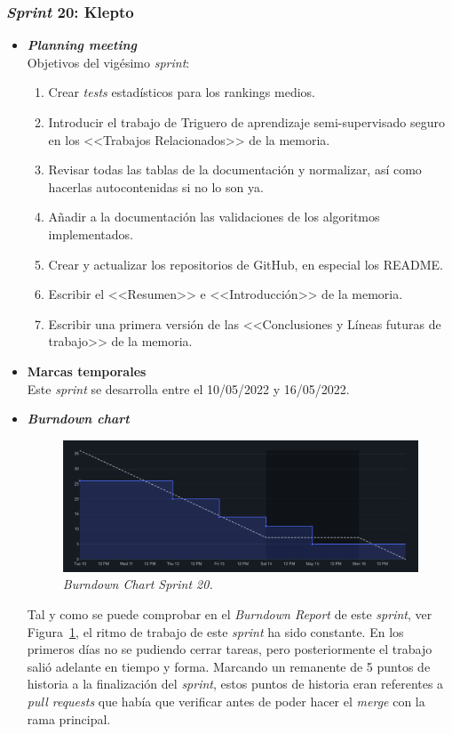\subsubsection{\textit{Sprint} 20: Klepto}
\begin{itemize}
\item \textbf{\textit{Planning meeting}}\\
Objetivos del vigésimo \textit{sprint}:
\begin{enumerate}
\item Crear \textit{tests} estadísticos para los rankings medios.
\item Introducir el trabajo de Triguero de aprendizaje semi-supervisado seguro~\cite{triguero2014characterization} en los <<Trabajos Relacionados>> de la memoria.
\item Revisar todas las tablas de la documentación y normalizar, así como hacerlas autocontenidas si no lo son ya.
\item Añadir a la documentación las validaciones de los algoritmos implementados.
\item Crear y actualizar los repositorios de GitHub, en especial los README.
\item Escribir el <<Resumen>> e <<Introducción>> de la memoria.
\item Escribir una primera versión de las <<Conclusiones y Líneas futuras de trabajo>> de la memoria.
\end{enumerate}

\item \textbf{Marcas temporales}\\
Este \textit{sprint} se desarrolla entre el 10/05/2022 y 16/05/2022.

\item \textbf{\textit{Burndown chart}}\\
\begin{figure}
\begin{center}
\includegraphics[width=\textwidth]{../img/anexos/sprints/BD-Sprint20}
\caption{\textit{Burndown Chart Sprint 20.}}\label{fig:BD-Sprint20}
\end{center}
\end{figure}
Tal y como se puede comprobar en el \textit{Burndown Report} de este \textit{sprint}, ver Figura~\ref{fig:BD-Sprint20}, el ritmo de trabajo de este \textit{sprint} ha sido constante. En los primeros días no se pudiendo cerrar tareas, pero posteriormente el trabajo salió adelante en tiempo y forma. Marcando un remanente de 5 puntos de historia a la finalización del \textit{sprint}, estos puntos de historia eran referentes a \textit{pull requests} que había que verificar antes de poder hacer el \textit{merge} con la rama principal.


\end{itemize}

